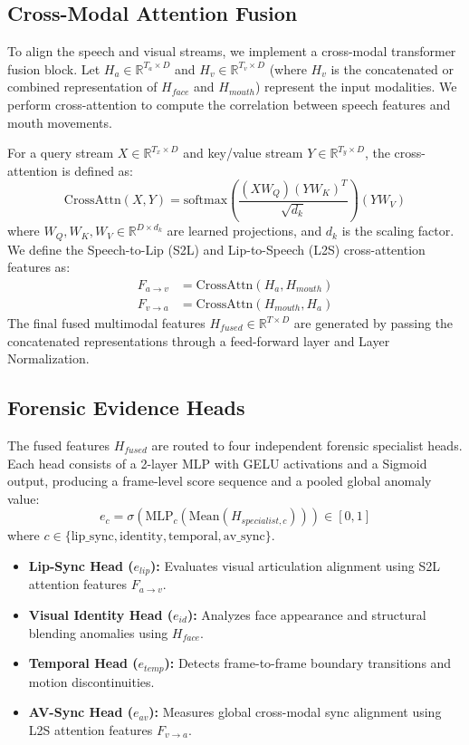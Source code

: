 \documentclass[journal,10pt,onecolumn,draftclsnofoot]{IEEEtran}
\begin{document}
\subsection{Cross-Modal Attention Fusion}
To align the speech and visual streams, we implement a cross-modal transformer fusion block. Let $H_a \in \mathbb{R}^{T_a \times D}$ and $H_v \in \mathbb{R}^{T_v \times D}$ (where $H_v$ is the concatenated or combined representation of $H_{face}$ and $H_{mouth}$) represent the input modalities. We perform cross-attention to compute the correlation between speech features and mouth movements.

For a query stream $X \in \mathbb{R}^{T_x \times D}$ and key/value stream $Y \in \mathbb{R}^{T_y \times D}$, the cross-attention is defined as:
\begin{equation}
    \text{CrossAttn}(X, Y) = \text{softmax}\left( \frac{(X W_Q) (Y W_K)^T}{\sqrt{d_k}} \right) (Y W_V)
\end{equation}
where $W_Q, W_K, W_V \in \mathbb{R}^{D \times d_k}$ are learned projections, and $d_k$ is the scaling factor. We define the Speech-to-Lip (S2L) and Lip-to-Speech (L2S) cross-attention features as:
\begin{align}
    F_{a \to v} &= \text{CrossAttn}(H_a, H_{mouth}) \\
    F_{v \to a} &= \text{CrossAttn}(H_{mouth}, H_a)
\end{align}
The final fused multimodal features $H_{fused} \in \mathbb{R}^{T \times D}$ are generated by passing the concatenated representations through a feed-forward layer and Layer Normalization.

\subsection{Forensic Evidence Heads}
The fused features $H_{fused}$ are routed to four independent forensic specialist heads. Each head consists of a 2-layer MLP with GELU activations and a Sigmoid output, producing a frame-level score sequence and a pooled global anomaly value:
\begin{equation}
    e_c = \sigma(\text{MLP}_c(\text{Mean}(H_{specialist, c}))) \in [0, 1]
\end{equation}
where $c \in \{\text{lip\_sync}, \text{identity}, \text{temporal}, \text{av\_sync}\}$.
\begin{itemize}
    \item \textbf{Lip-Sync Head ($e_{lip}$):} Evaluates visual articulation alignment using S2L attention features $F_{a \to v}$.
    \item \textbf{Visual Identity Head ($e_{id}$):} Analyzes face appearance and structural blending anomalies using $H_{face}$.
    \item \textbf{Temporal Head ($e_{temp}$):} Detects frame-to-frame boundary transitions and motion discontinuities.
    \item \textbf{AV-Sync Head ($e_{av}$):} Measures global cross-modal sync alignment using L2S attention features $F_{v \to a}$.
\end{itemize}
\end{document}
